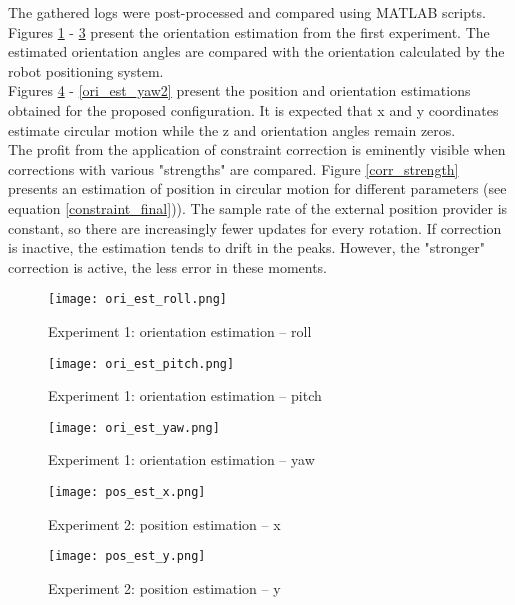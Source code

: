 The gathered logs were post-processed and compared using MATLAB scripts. Figures \ref{ori_est_roll} - \ref{ori_est_yaw} present the orientation estimation from the first experiment. The estimated orientation angles are compared with the orientation calculated by the robot positioning system.\\

Figures \ref{pos_est_x} - \ref{ori_est_yaw2} present the position and orientation estimations obtained for the proposed configuration. It is expected that x and y coordinates estimate circular motion while the z and orientation angles remain zeros.\\

The profit from the application of constraint correction is eminently visible when corrections with various "strengths" are compared. Figure \ref{corr_strength} presents an estimation of position in circular motion for different parameters (see equation \ref{constraint_final})). The sample rate of the external position provider is constant, so there are increasingly fewer updates for every rotation. If correction is inactive, the estimation tends to drift in the peaks. However, the "stronger" correction is active, the less error in these moments.

\begin{figure}[p]
	\centering
	\texttt{[image: ori\_est\_roll.png]}
	\caption{Experiment 1: orientation estimation -- roll}
	\label{ori_est_roll}
\end{figure}

\begin{figure}[p]
	\centering
	\texttt{[image: ori\_est\_pitch.png]}
	\caption{Experiment 1: orientation estimation -- pitch}
	\label{ori_est_pitch}
\end{figure}


\begin{figure}[p]
	\centering
	\texttt{[image: ori\_est\_yaw.png]}
	\caption{Experiment 1: orientation estimation -- yaw}
	\label{ori_est_yaw}
\end{figure}

\begin{figure}[p]
	\centering
	\texttt{[image: pos\_est\_x.png]}
	\caption{Experiment 2: position estimation -- x}
	\label{pos_est_x}
\end{figure}

\begin{figure}[p]
	\centering
	\texttt{[image: pos\_est\_y.png]}
	\caption{Experiment 2: position estimation -- y}
	\label{pos_est_y}
\end{figure}

